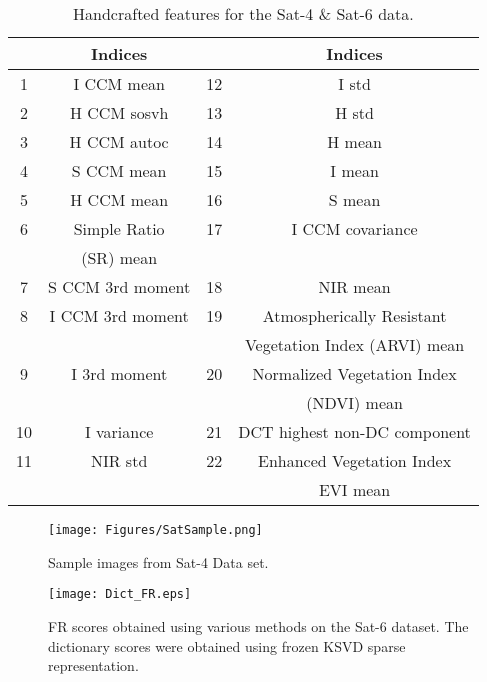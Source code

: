 
\begin{table}[tbp]
    \caption{Handcrafted features for the Sat-4 \& Sat-6 data.}\label{table: Features}
    \centering
    \begin{tabular}{|c|c|c|c|}
        \hline
        \textbf{} & \textbf{Indices} & \textbf{} & \textbf{Indices}\\
        \hline
        1 & I CCM mean & 12 & I std \\
        \hline
        2 & H CCM sosvh & 13 & H std \\
        \hline
        3 & H CCM autoc & 14 & H mean \\
        \hline
        4 & S CCM mean & 15 & I mean \\
        \hline
        5 & H CCM mean & 16 & S mean \\
        \hline
        6 & Simple Ratio & 17 & I CCM covariance \\
        & (SR) mean & & \\
        \hline
        7 & S CCM 3rd moment & 18 & NIR mean \\
        \hline
        8 & I CCM 3rd moment & 19 & Atmospherically Resistant  \\
        & & & Vegetation Index (ARVI) mean\\
        \hline
        9 & I 3rd moment & 20 & Normalized Vegetation Index \\
        & & & (NDVI) mean\\
        \hline
        10 & I variance & 21 & DCT highest non-DC component\\
        \hline
        11 & NIR std & 22 & Enhanced Vegetation Index \\
        & & &EVI mean\\
        \hline
    \end{tabular}
\end{table}

\begin{figure}[H]
\centerline{\texttt{[image: Figures/SatSample.png]}}
\caption{Sample images from Sat-4 Data set.}\label{fig: SatSample}
\end{figure}

\begin{figure*}[!t]%
\centering
\texttt{[image: Dict\_FR.eps]}
\caption{FR scores obtained using various methods on the Sat-6 dataset. The dictionary scores were obtained using frozen KSVD sparse representation.}%
\label{fig:FR}%
\end{figure*}


